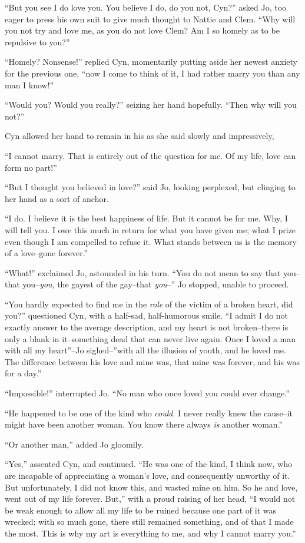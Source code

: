 ``But you see I do love you. You believe I do, do you not, Cyn?'' asked
Jo, too eager to press his own suit to give much thought to Nattie and
Clem. ``Why will you not try and love me, as you do not love Clem? Am I
so homely as to be repulsive to you?''

``Homely? Nonsense!'' replied Cyn, momentarily putting aside her newest
anxiety for the previous one, ``now I come to think of it, I had rather
marry you than any man I know!''

``Would you? Would you really?'' seizing her hand hopefully. ``Then why
will you not?''

Cyn allowed her hand to remain in his as she said slowly and
impressively,

``I cannot marry. That is entirely out of the question for me. Of my
life, love can form no part!''

``But I thought you believed in love?'' said Jo, looking perplexed, but
clinging to her hand as a sort of anchor.

``I do. I believe it is the best happiness of life. But it cannot be for
me. Why, I will tell you. I owe this much in return for what you have
given me; what I prize even though I am compelled to refuse it. What
stands between us is the memory of a love--gone forever.''

``What!'' exclaimed Jo, astounded in his turn. ``You do not mean to say
that you--that you--\emph{you}, the gayest of the gay--that \emph{you}--'' Jo stopped,
unable to proceed.

``You hardly expected to find me in the \emph{role} of the victim of a broken
heart, did you?'' questioned Cyn, with a half-sad, half-humorous smile.
``I admit I do not exactly answer to the average description, and my
heart is not broken--there is only a blank in it--something dead that
can never live again. Once I loved a man with all my heart''--Jo
sighed--''with all the illusion of youth, and he loved me. The difference
between his love and mine was, that mine was forever, and his was for a
day.''

``Impossible!'' interrupted Jo. ``No man who once loved you could ever
change.''

``He happened to be one of the kind who \emph{could}. I never really knew the
cause--it might have been another woman. You know there always \emph{is}
another woman.''

``Or another man,'' added Jo gloomily.

``Yes,'' assented Cyn, and continued. ``He was one of the kind, I think
now, who are incapable of appreciating a woman's love, and consequently
unworthy of it. But unfortunately, I did not know this, and wasted mine
on him. So he and love, went out of my life forever. But,'' with a proud
raising of her head, ``I would not be weak enough to allow all my life to
be ruined because one part of it was wrecked; with so much gone, there
still remained something, and of that I made the most. This is why my
art is everything to me, and why I cannot marry you.''

